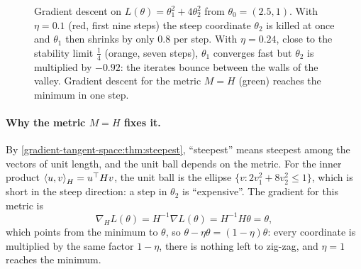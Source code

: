 \begin{notechapter}
\begin{figure}[ht]
\centering
{}
\caption{Gradient descent on $L(\theta) = \theta_1^2 + 4\theta_2^2$ from $\theta_0 = (2.5, 1)$. With $\eta = 0.1$ (red, first nine
steps) the steep coordinate $\theta_2$ is killed at once and $\theta_1$ then shrinks by only $0.8$ per step. With
$\eta = 0.24$, close to the stability limit $\frac14$ (orange, seven steps), $\theta_1$ converges fast but $\theta_2$ is multiplied by
$-0.92$: the iterates bounce between the walls of the valley. Gradient descent for the metric $M = H$
(green) reaches the minimum in one step.}
\label{gradient-tangent-space:fig:zigzag}
\end{figure}

\paragraph{Why the metric $M = H$ fixes it.} By \cref{gradient-tangent-space:thm:steepest}, ``steepest'' means
steepest among the vectors of unit length, and the unit ball depends on the metric. For the inner
product $\left\langle u, v \right\rangle_H = u^\top Hv$, the unit ball is the ellipse $\{v : 2v_1^2 + 8v_2^2\leq1\}$, which is short in the steep
direction: a step in $\theta_2$ is ``expensive''. The gradient for this metric is
\[
  \nabla_HL(\theta) = H^{-1}\nabla L(\theta) = H^{-1}H\theta = \theta,
\]
which points from the minimum to $\theta$, so $\theta - \eta\theta = (1 - \eta)\theta$: every coordinate is multiplied by the same
factor $1 - \eta$, there is nothing left to zig-zag, and $\eta = 1$ reaches the minimum.


\end{notechapter}
